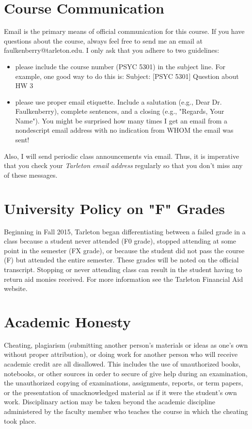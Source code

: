 \documentclass[10pt]{article}
\begin{document}
\section*{Course Communication}
\label{sec:org163beea}

Email is the primary means of official communication for this course.  If you have questions about the course, always feel free to send me an email at faulkenberry@tarleton.edu.  I only ask that you adhere to two guidelines:
\begin{itemize}
\item please include the course number (PSYC 5301) in the subject line.  For example, one good way to do this is:  Subject: [PSYC 5301] Question about HW 3
\item please use proper email etiquette.  Include a salutation (e.g., Dear Dr. Faulkenberry), complete sentences, and a closing (e.g., "Regards, Your Name").  You might be surprised how many times I get an email from a nondescript email address with no indication from WHOM the email was sent!
\end{itemize}

Also, I will send periodic class announcements via email.  Thus, it is imperative that you check your \emph{Tarleton email address} regularly so that you don't miss any of these messages.

\section*{University Policy on "F" Grades}
\label{sec:org66ec042}

Beginning in Fall 2015, Tarleton began differentiating between a failed grade in a class because a student never attended (F0 grade), stopped attending at some point in the semester (FX grade), or because the student did not pass the course (F) but attended the entire semester. These grades will be noted on the official transcript. Stopping or never attending class can result in the student having to return aid monies received.  For more information see the Tarleton Financial Aid website.

\section*{Academic Honesty}
\label{sec:orgb3523e2}

Cheating, plagiarism (submitting another person’s materials or ideas as one’s own without proper attribution), or doing work for another person who will receive academic credit are all disallowed. This includes the use of unauthorized books, notebooks, or other sources in order to secure of give help during an examination, the unauthorized copying of examinations, assignments, reports, or term papers, or the presentation of unacknowledged material as if it were the student’s own work. Disciplinary action may be taken beyond the academic discipline administered by the faculty member who teaches the course in which the cheating took place.
\end{document}
